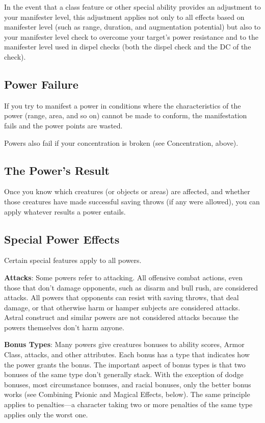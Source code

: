 In the event that a class feature or other special ability provides an adjustment to your manifester level, this adjustment applies not only to all effects based on manifester level (such as range, duration, and augmentation potential) but also to your manifester level check to overcome your target's power resistance and to the manifester level used in dispel checks (both the dispel check and the DC of the check).

\subsection{Power Failure}
If you try to manifest a power in conditions where the characteristics of the power (range, area, and so on) cannot be made to conform, the manifestation fails and the power points are wasted.

Powers also fail if your concentration is broken (see Concentration, above).

\subsection{The Power's Result}
Once you know which creatures (or objects or areas) are affected, and whether those creatures have made successful saving throws (if any were allowed), you can apply whatever results a power entails.

\subsection{Special Power Effects}
Certain special features apply to all powers.

\textbf{Attacks}: Some powers refer to attacking. All offensive combat actions, even those that don't damage opponents, such as disarm and bull rush, are considered attacks. All powers that opponents can resist with saving throws, that deal damage, or that otherwise harm or hamper subjects are considered attacks. Astral construct and similar powers are not considered attacks because the powers themselves don't harm anyone.

\textbf{Bonus Types}: Many powers give creatures bonuses to ability scores, Armor Class, attacks, and other attributes. Each bonus has a type that indicates how the power grants the bonus. The important aspect of bonus types is that two bonuses of the same type don't generally stack. With the exception of dodge bonuses, most circumstance bonuses, and racial bonuses, only the better bonus works (see Combining Psionic and Magical Effects, below). The same principle applies to penalties—a character taking two or more penalties of the same type applies only the worst one.

